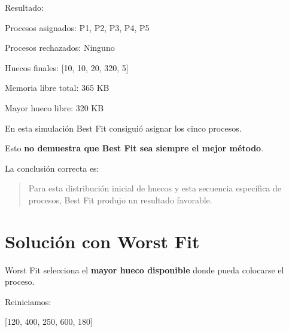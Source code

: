 \documentclass[
  spanish,
  letterpaper,
]{scrbook}
\newenvironment{Shaded}{\begin{snugshade}}{\end{snugshade}}
\newcommand{\NormalTok}[1]{\textcolor[rgb]{0.00,0.23,0.31}{#1}}
\begin{document}
Resultado:

\begin{Shaded}
\begin{Highlighting}[]
\NormalTok{Procesos asignados:}
\NormalTok{P1, P2, P3, P4, P5}

\NormalTok{Procesos rechazados:}
\NormalTok{Ninguno}

\NormalTok{Huecos finales:}
\NormalTok{[10, 10, 20, 320, 5]}

\NormalTok{Memoria libre total:}
\NormalTok{365 KB}

\NormalTok{Mayor hueco libre:}
\NormalTok{320 KB}
\end{Highlighting}
\end{Shaded}

\begin{tcolorbox}[enhanced jigsaw, arc=.35mm, bottomrule=.15mm, bottomtitle=1mm, breakable, colback=white, colbacktitle=quarto-callout-warning-color!10!white, colframe=quarto-callout-warning-color-frame, coltitle=black, left=2mm, leftrule=.75mm, opacityback=0, opacitybacktitle=0.6, rightrule=.15mm, title=\textcolor{quarto-callout-warning-color}{\faExclamationTriangle}\hspace{0.5em}{Una conclusión que debemos evitar}, titlerule=0mm, toprule=.15mm, toptitle=1mm]

En esta simulación Best Fit consiguió asignar los cinco procesos.

Esto \textbf{no demuestra que Best Fit sea siempre el mejor método}.

La conclusión correcta es:

\begin{quote}
Para esta distribución inicial de huecos y esta secuencia específica de
procesos, Best Fit produjo un resultado favorable.
\end{quote}

\end{tcolorbox}


\chapter{Solución con Worst Fit}\label{soluciuxf3n-con-worst-fit}

Worst Fit selecciona el \textbf{mayor hueco disponible} donde pueda
colocarse el proceso.

Reiniciamos:

\begin{Shaded}
\begin{Highlighting}[]
\NormalTok{[120, 400, 250, 600, 180]}
\end{Highlighting}
\end{Shaded}
\end{document}
